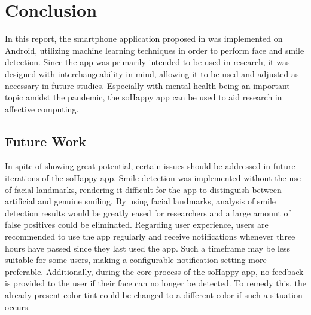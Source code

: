 \section{Conclusion} \label{sec:conclusion}
In this report, the smartphone application proposed in \cite{sohappy} was implemented on Android, utilizing machine learning techniques in order to perform face and smile detection.
Since the app was primarily intended to be used in research, it was designed with interchangeability in mind, allowing it to be used and adjusted as necessary in future studies. Especially with mental health being an important topic amidst the pandemic, the soHappy app can be used to aid research in affective computing.

\subsection{Future Work} \label{sec:future_work}
In spite of showing great potential, certain issues should be addressed in future iterations of the soHappy app.
Smile detection was implemented without the use of facial landmarks, rendering it difficult for the app to distinguish between artificial and genuine smiling. By using facial landmarks, analysis of smile detection results would be greatly eased for researchers and a large amount of false positives could be eliminated.
Regarding user experience, users are recommended to use the app regularly and receive notifications whenever three hours have passed since they last used the app. Such a timeframe may be less suitable for some users, making a configurable notification setting more preferable.
Additionally, during the core process of the soHappy app, no feedback is provided to the user if their face can no longer be detected. To remedy this, the already present color tint could be changed to a different color if such a situation occurs.

